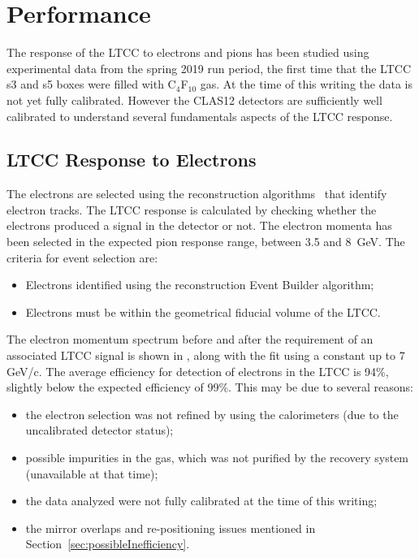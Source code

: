 \section{Performance}

The response of the LTCC to electrons and pions has been studied using experimental data from the spring 2019
run period, the first time that the LTCC s3 and s5 boxes were filled with C$_4$F$_{10}$ gas. At the time of this
writing the data is not yet fully calibrated. However the CLAS12 detectors are sufficiently well calibrated to
understand several fundamentals aspects of the LTCC response.

\subsection{LTCC Response to Electrons}
\label{sec:elecResponse}

The electrons are selected using the reconstruction algorithms~\cite{recon-nim} that identify electron tracks. The
LTCC response is calculated by checking whether the electrons produced a signal in the detector or not. The electron
momenta has been selected in the expected pion response range, between 3.5 and 8~GeV. The criteria for event
selection are:

\begin{itemize}
\item  Electrons identified using the reconstruction Event Builder algorithm;
\item Electrons must be within the geometrical fiducial volume of the LTCC.
\end{itemize}


The electron momentum spectrum before and after the requirement of an associated LTCC signal is shown in
, along with the fit using a constant up to 7 GeV/c. The average efficiency for detection of
electrons in the LTCC is 94$\%$, slightly below the expected efficiency of 99$\%$. This may be due to
several reasons:

\begin{itemize}
\item the electron selection was not refined by using the calorimeters (due to the uncalibrated detector status);
\item possible impurities in the gas, which was not purified by the recovery system (unavailable at that time);
\item the data analyzed were not fully calibrated at the time of this writing;
\item the mirror overlaps and re-positioning issues mentioned in Section~\ref{sec:possibleInefficiency}.
\end{itemize}

